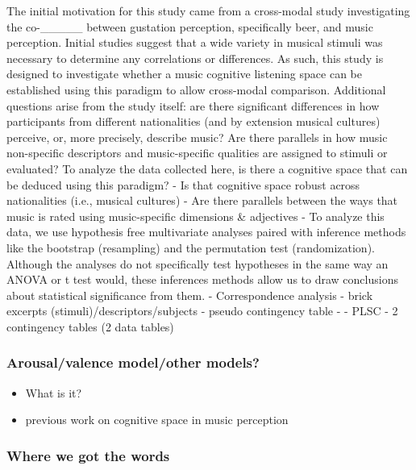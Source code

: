 \documentclass[
  english,
  man]{apa6}
\providecommand{\tightlist}{%
  \setlength{\itemsep}{0pt}\setlength{\parskip}{0pt}}
\begin{document}
The initial motivation for this study came from a cross-modal study investigating the co-\_\_\_\_\_ between gustation perception, specifically beer, and music perception. Initial studies suggest that a wide variety in musical stimuli was necessary to determine any correlations or differences. As such, this study is designed to investigate whether a music cognitive listening space can be established using this paradigm to allow cross-modal comparison. Additional questions arise from the study itself: are there significant differences in how participants from different nationalities (and by extension musical cultures) perceive, or, more precisely, describe music? Are there parallels in how music non-specific descriptors and music-specific qualities are assigned to stimuli or evaluated?
To analyze the data collected here,
is there a cognitive space that can be deduced using this paradigm?
- Is that cognitive space robust across nationalities (i.e., musical cultures)
- Are there parallels between the ways that music is rated using music-specific dimensions \& adjectives
- To analyze this data, we use hypothesis free multivariate analyses paired with inference methods like the bootstrap (resampling) and the permutation test (randomization). Although the analyses do not specifically test hypotheses in the same way an ANOVA or t test would, these inferences methods allow us to draw conclusions about statistical significance from them.
- Correspondence analysis
- brick excerpts (stimuli)/descriptors/subjects
- pseudo contingency table
-
- PLSC
- 2 contingency tables (2 data tables)

\hypertarget{arousalvalence-modelother-models}{%
\subsubsection{Arousal/valence model/other models?}\label{arousalvalence-modelother-models}}

\begin{itemize}
\tightlist
\item
  What is it?
\item
  previous work on cognitive space in music perception
\end{itemize}

\hypertarget{where-we-got-the-words}{%
\subsubsection{Where we got the words}\label{where-we-got-the-words}}
\end{document}
